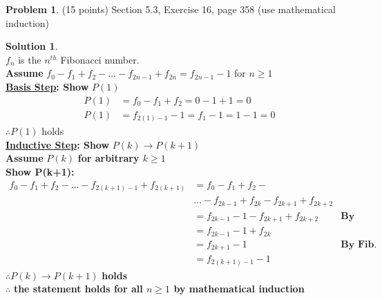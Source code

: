 \documentclass{article}
\theoremstyle{definition}
\newtheorem{problem}{Problem}
\newtheorem*{solution}{Solution}
\begin{document}
\begin{problem} (15 points)
Section 5.3, Exercise 16, page 358 (use mathematical induction)
\end{problem}
\begin{solution}  \ \\
$f_n$ is the $n^{th}$ Fibonacci number. \\
\textbf{Assume} $f_0 - f_1 + f_2 - \dots - f_{2n-1} + f_{2n} = f_{2n-1} - 1 $ for $n\ge 1$ \\
\textbf{\underline{Basis Step}: Show }$P(1)$ \\
\begin{align*}
P(1) &= f_0 - f_1 + f_2 = 0 - 1 + 1 = 0 \\
P(1) &= f_{2(1) - 1} - 1 = f_1 - 1 = 1 - 1 = 0
\end{align*}
$\therefore P(1)$ holds \\
\textbf{\underline{Inductive Step}: Show } $P(k) \rightarrow P(k+1)$ \\
\textbf{Assume} $P(k)$ \textbf{for arbitrary $k \ge  1$} \\
\textbf{Show P(k+1):} \\
\begin{align*}
  f_0 - f_1 + f_2 - \dots - f_{2(k+1)-1} + f_{2(k+1)} &= f_0 - f_1 + f_2 - \\
  & \dots - f_{2k-1} + f_{2k} - f_{2k+1} + f_{2k+2} \\
  &= f_{2k-1} - 1 - f_{2k+1} + f_{2k+2} &\textbf{By Inductive Hypothesis}\\
  &= f_{2k-1} - 1 + f_{2k} \\
  &= f_{2k+1} - 1 &\textbf{By Fib.}\\
  &= f_{2(k+1) - 1} - 1
\end{align*}
$\therefore P(k) \rightarrow P(k+1)$ \textbf{holds}\\
$\therefore$ \textbf{the statement holds for all $n \ge 1 $ by mathematical induction}
\end{solution}
\end{document}
